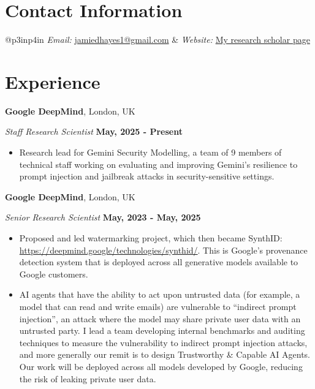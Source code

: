 \documentclass[margin,line]{res}
\begin{document}

\begin{resume}
\section{\sc Contact Information}
\vspace{.05in}
\begin{tabular}{@{}p{3in}p{4in}}
{\it Email:}    \url{jamiedhayes1@gmail.com} 
& {\it Website:} \href{https://scholar.google.com/citations?hl=en&user=95gIFIgAAAAJ}{My research scholar page}\\      
   
\end{tabular}

\section{\sc Experience}

{\bf Google DeepMind}, London, UK

\vspace{-.3cm}
{\em Staff Research Scientist} \hfill {\bf May, 2025 - Present}
\vspace{1em}
\begin{itemize}
\item Research lead for Gemini Security Modelling, a team of 9 members of technical staff working on evaluating and improving Gemini's resilience to prompt injection and jailbreak attacks in security-sensitive settings.
\end{itemize}

{\bf Google DeepMind}, London, UK

\vspace{-.3cm}
{\em Senior Research Scientist} \hfill {\bf May, 2023 - May, 2025}
\vspace{1em}
\begin{itemize}
\item Proposed and led watermarking project, which then became SynthID: \url{https://deepmind.google/technologies/synthid/}. This is Google's provenance detection system that is deployed across all generative models available to Google customers.
\item AI agents that have the ability to act upon untrusted data (for example, a model that can read and write emails) are vulnerable to ``indirect prompt injection'', an attack where the model may share private user data with an untrusted party. I lead a team developing internal benchmarks and auditing techniques to measure the vulnerability to indirect prompt injection attacks, and more generally our remit is to design Trustworthy \& Capable AI Agents. Our work will be deployed across all models developed by Google, reducing the risk of leaking private user data.
\end{itemize}


\end{resume}
\end{document}
